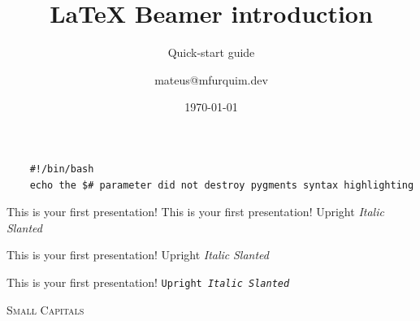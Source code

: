 \documentclass{beamer}
\title {\LaTeX{} Beamer introduction}
\subtitle{Quick-start guide}
\author{mateus@mfurquim.dev}
\institute{MFurquim Dev}
\date{\today}
\begin{document}

\begin{frame}[fragile]
    \ttfamily
	\begin{lstlisting}
	#!/bin/bash
	echo the $# parameter did not destroy pygments syntax highlighting
	\end{lstlisting}
\end{frame}

\lstset{basicstyle=\footnotesize\ttfamily,breaklines=true}
\begin{frame}
	
\end{frame}


\begin{frame}

    This is your first presentation!
	\newline
    \rmfamily This is your first presentation!
	\newline
	\textup{Upright} \textit{Italic} \textsl{Slanted}
	\newline


    \sffamily This is your first presentation!
	\newline
	\textsf{Upright  \textit{Italic} \textsl{Slanted}}
	\newline

    \ttfamily This is your first presentation!
	\newline
	\texttt{Upright  \textit{Italic} \textsl{Slanted}}
	\newline

	\textsc{Small Capitals}

\end{frame}
\end{document}
